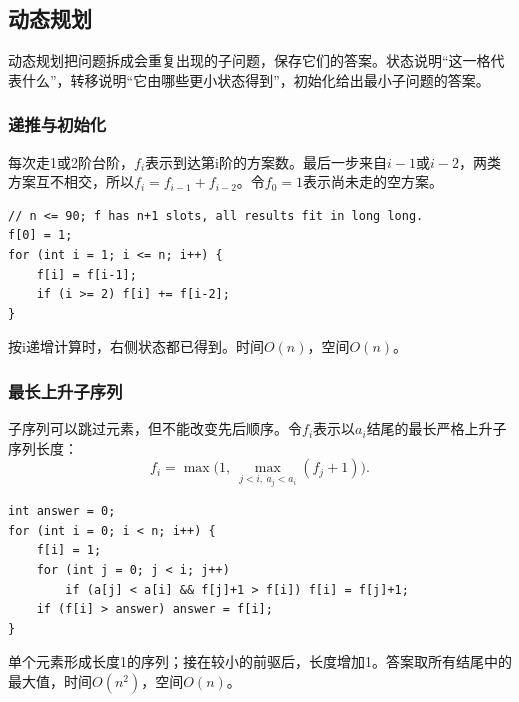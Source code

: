 \documentclass[UTF8,11pt,a4paper,fontset=none]{ctexart}
\begin{document}
\subsection{动态规划}
动态规划把问题拆成会重复出现的子问题，保存它们的答案。状态说明“这一格代表什么”，转移说明“它由哪些更小状态得到”，初始化给出最小子问题的答案。
\subsubsection{递推与初始化}
每次走1或2阶台阶，$f_i$表示到达第i阶的方案数。最后一步来自$i-1$或$i-2$，两类方案互不相交，所以$f_i=f_{i-1}+f_{i-2}$。令$f_0=1$表示尚未走的空方案。
\par\noindent\begin{minipage}{\linewidth}
\begin{lstlisting}
// n <= 90; f has n+1 slots, all results fit in long long.
f[0] = 1;
for (int i = 1; i <= n; i++) {
    f[i] = f[i-1];
    if (i >= 2) f[i] += f[i-2];
}
\end{lstlisting}
\end{minipage}\par
按i递增计算时，右侧状态都已得到。时间$O(n)$，空间$O(n)$。
\subsubsection{最长上升子序列}
子序列可以跳过元素，但不能改变先后顺序。令$f_i$表示以$a_i$结尾的最长严格上升子序列长度：
\[
f_i=\max\bigl(1,\ \max_{j<i,\ a_j<a_i}(f_j+1)\bigr).
\]
\par\noindent\begin{minipage}{\linewidth}
\begin{lstlisting}
int answer = 0;
for (int i = 0; i < n; i++) {
    f[i] = 1;
    for (int j = 0; j < i; j++)
        if (a[j] < a[i] && f[j]+1 > f[i]) f[i] = f[j]+1;
    if (f[i] > answer) answer = f[i];
}
\end{lstlisting}
\end{minipage}\par
单个元素形成长度1的序列；接在较小的前驱后，长度增加1。答案取所有结尾中的最大值，时间$O(n^2)$，空间$O(n)$。
\end{document}
